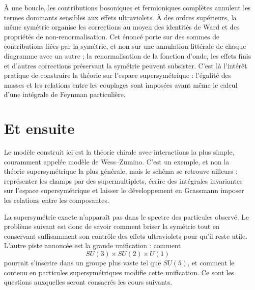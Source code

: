 À une boucle, les contributions bosoniques et fermioniques complètes annulent les termes dominants sensibles aux effets ultraviolets. À des ordres supérieurs, la même symétrie organise les corrections au moyen des identités de Ward et des propriétés de non-renormalisation. Cet énoncé porte sur des sommes de contributions liées par la symétrie, et non sur une annulation littérale de chaque diagramme avec un autre ; la renormalisation de la fonction d’onde, les effets finis et d’autres corrections préservant la symétrie peuvent subsister. C’est là l’intérêt pratique de construire la théorie sur l’espace supersymétrique : l’égalité des masses et les relations entre les couplages sont imposées avant même le calcul d’une intégrale de Feynman particulière.

\section{Et ensuite}

Le modèle construit ici est la théorie chirale avec interactions la plus simple, couramment appelée modèle de Wess--Zumino. C’est un exemple, et non la théorie supersymétrique la plus générale, mais le schéma se retrouve ailleurs : représenter les champs par des supermultiplets, écrire des intégrales invariantes sur l’espace supersymétrique et laisser le développement en Grassmann imposer les relations entre les composantes.

La supersymétrie exacte n’apparaît pas dans le spectre des particules observé. Le problème suivant est donc de savoir comment briser la symétrie tout en conservant suffisamment son contrôle des effets ultraviolets pour qu’il reste utile. L’autre piste annoncée est la grande unification : comment
\begin{equation}
SU(3)\times SU(2)\times U(1)
\end{equation}
pourrait s’inscrire dans un groupe plus vaste tel que \(SU(5)\), et comment le contenu en particules supersymétriques modifie cette unification. Ce sont les questions auxquelles seront consacrés les cours suivants.
